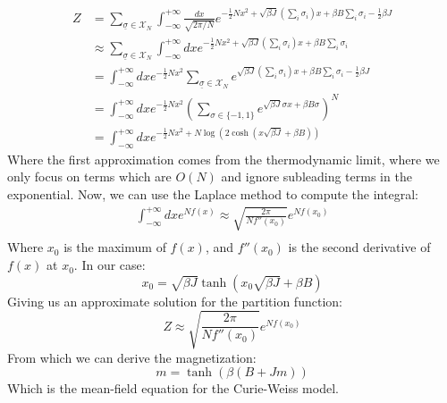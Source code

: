 \begin{equation}
    \begin{aligned}
        Z &= \sum_{\underline{\sigma}\in\mathcal{X}_N}\int_{-\infty}^{+\infty}\frac{dx}{\sqrt{2\pi/N}} e^{-\frac{1}{2}Nx^2+\sqrt{\beta J}\left(\sum_i \sigma_i\right)x+\beta B \sum_i \sigma_i-\frac{1}{2}\beta J} \\
        &\approx \sum_{\underline{\sigma}\in\mathcal{X}_N}\int_{-\infty}^{+\infty}dx e^{-\frac{1}{2}Nx^2+\sqrt{\beta J}\left(\sum_i \sigma_i\right)x+\beta B \sum_i \sigma_i} \\
        &= \int_{-\infty}^{+\infty}dx e^{-\frac{1}{2}Nx^2} \sum_{\underline{\sigma}\in\mathcal{X}_N}e^{\sqrt{\beta J}\left(\sum_i \sigma_i\right)x+\beta B \sum_i \sigma_i-\frac{1}{2}\beta J}\\
        &= \int_{-\infty}^{+\infty}dx e^{-\frac{1}{2}Nx^2} \left(\sum_{\sigma \in \{-1,1\}}e^{\sqrt{\beta J}\sigma x+\beta B \sigma}\right)^N\\
        &=  \int_{-\infty}^{+\infty}dx e^{-\frac{1}{2}Nx^2+N\log\left(2\cosh(x\sqrt{\beta J}+\beta B)\right)}
    \end{aligned}
\end{equation}
Where the first approximation comes from the thermodynamic limit, where we only focus on terms which are $O(N)$ and ignore subleading terms in the exponential. Now, we can use the Laplace method to compute the integral:
\begin{equation}
    \begin{aligned}
        \int_{-\infty}^{+\infty}dx e^{Nf(x)} \approx \sqrt{\frac{2\pi}{Nf''(x_0)}}e^{Nf(x_0)}\\
    \end{aligned}
\end{equation}
Where $x_0$ is the maximum of $f(x)$, and $f''(x_0)$ is the second derivative of $f(x)$ at $x_0$. In our case:
\begin{equation}
    x_0 = \sqrt{\beta J}\tanh(x_0\sqrt{\beta J}+\beta B)
\end{equation}
Giving us an approximate solution for the partition function:
\begin{equation}
    Z \approx \sqrt{\frac{2\pi}{Nf''(x_0)}}e^{Nf(x_0)}
\end{equation}
From which we can derive the magnetization:
\begin{equation}
    m = \tanh(\beta(B+Jm))
\end{equation}
Which is the mean-field equation for the Curie-Weiss model.